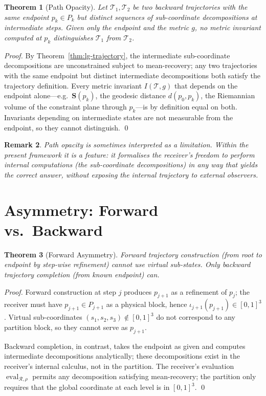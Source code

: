 \documentclass[twocolumn,a4paper]{article}
\newtheorem{theorem}{Theorem}[section]
\newtheorem{remark}[theorem]{Remark}
\DeclareMathOperator{\eval}{eval}
\newcommand{\receiver}{\mathcal{R}}
\newcommand{\Stuple}{\mathbf{S}}
\newcommand{\Trajec}{\mathcal{T}}
\begin{document}
\begin{theorem}[Path Opacity]
\label{thm:path-opacity}
Let $\Trajec_{1},\Trajec_{2}$ be two backward trajectories with the same endpoint $p_{k}\in P_{k}$ but distinct sequences of sub-coordinate decompositions at intermediate steps. Given only the endpoint and the metric $g$, no metric invariant computed at $p_{k}$ distinguishes $\Trajec_{1}$ from $\Trajec_{2}$.
\end{theorem}

\begin{proof}
By Theorem~\ref{thm:lg-trajectory}, the intermediate sub-coordinate decompositions are unconstrained subject to mean-recovery; any two trajectories with the same endpoint but distinct intermediate decompositions both satisfy the trajectory definition. Every metric invariant $I(\Trajec,g)$ that depends on the endpoint alone---e.g.\ $\Stuple(p_{k})$, the geodesic distance $d(p_{0},p_{k})$, the Riemannian volume of the constraint plane through $p_{k}$---is by definition equal on both. Invariants depending on intermediate states are not measurable from the endpoint, so they cannot distinguish. \qed
\end{proof}

\begin{remark}
Path opacity is sometimes interpreted as a limitation. Within the present framework it is a feature: it formalises the receiver's freedom to perform internal computations (the sub-coordinate decompositions) in any way that yields the correct answer, without exposing the internal trajectory to external observers.
\end{remark}

\section{Asymmetry: Forward vs.\ Backward}
\label{sec:asymmetry}

\begin{theorem}[Forward Asymmetry]
\label{thm:forward-asymmetry}
Forward trajectory construction (from root to endpoint by step-wise refinement) cannot use virtual sub-states. Only backward trajectory completion (from known endpoint) can.
\end{theorem}

\begin{proof}
Forward construction at step $j$ produces $p_{j+1}$ as a refinement of $p_{j}$; the receiver must have $p_{j+1}\in P_{j+1}$ as a physical block, hence $\iota_{j+1}(p_{j+1})\in[0,1]^{3}$. Virtual sub-coordinates $(s_{1},s_{2},s_{3})\notin[0,1]^{3}$ do not correspond to any partition block, so they cannot serve as $p_{j+1}$.

Backward completion, in contrast, takes the endpoint as given and computes intermediate decompositions analytically; these decompositions exist in the receiver's internal calculus, not in the partition. The receiver's evaluation $\eval_{\receiver,\rho}$ permits any decomposition satisfying mean-recovery; the partition only requires that the global coordinate at each level is in $[0,1]^{3}$. \qed
\end{proof}
\end{document}

